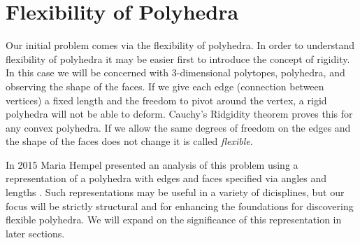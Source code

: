 \section{Flexibility of Polyhedra}

Our initial problem comes via the flexibility of polyhedra. In order to
understand flexibility of polyhedra it may be easier first to introduce the
concept of rigidity. In this case we will be concerned with 3-dimensional
polytopes, polyhedra, and observing the shape of the faces. If we give each
edge (connection between vertices) a fixed length and the freedom to pivot
around the vertex, a rigid polyhedra will not be able to deform. Cauchy's
Ridgidity theorem proves this for any convex polyhedra\cite{Gluck_1975}.
If we allow the same degrees of freedom on the edges and the shape of the
faces does not change it is called \emph{flexible}\cite{Connelly_1977}.

In 2015 Maria Hempel presented an analysis of this problem using a representation
of a polyhedra with edges and faces specified via angles and lengths
\cite{Hempel_2015}.
Such representations may be useful in a variety of dicisplines, but our
focus will be strictly structural and for enhancing the foundations for
discovering flexible polyhedra.
We will expand on the significance of this representation in later sections.

